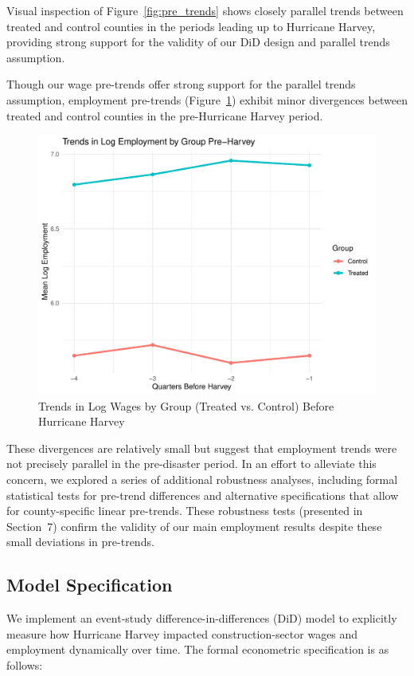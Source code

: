\documentclass{article}
\begin{document}
Visual inspection of Figure~\ref{fig:pre_trends} shows closely parallel trends between treated and control counties in the periods leading up to Hurricane Harvey, providing strong support for the validity of our DiD design and parallel trends assumption.

Though our wage pre-trends offer strong support for the parallel trends assumption, employment pre-trends (Figure~\ref{fig:empl_pre_trends}) exhibit minor divergences between treated and control counties in the pre-Hurricane Harvey period. 

\begin{figure}[H]
    \centering
    \includegraphics[width=0.9\linewidth]{Rplot08.pdf}
    \caption{Trends in Log Wages by Group (Treated vs. Control) Before Hurricane Harvey}
    \label{fig:empl_pre_trends}
\end{figure}

These divergences are relatively small but suggest that employment trends were not precisely parallel in the pre-disaster period. In an effort to alleviate this concern, we explored a series of additional robustness analyses, including formal statistical tests for pre-trend differences and alternative specifications that allow for county-specific linear pre-trends. These robustness tests (presented in Section~7) confirm the validity of our main employment results despite these small deviations in pre-trends.


\subsection{Model Specification}

We implement an event-study difference-in-differences (DiD) model to explicitly measure how Hurricane Harvey impacted construction-sector wages and employment dynamically over time. The formal econometric specification is as follows:
\end{document}
